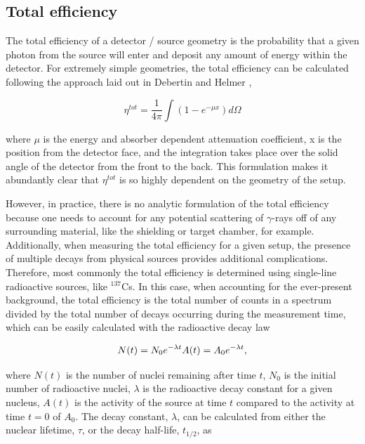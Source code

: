 \subsection{Total efficiency}

The total efficiency of a detector / source geometry is the probability that a given photon from the source will enter and deposit any amount of energy within the detector. For extremely simple geometries, the total efficiency can be calculated following the approach laid out in Debertin and Helmer \cite{DebertinHelmerBook},

\begin{equation}
\eta^{tot} = \dfrac{1}{4\pi} \int \left(1 - e^{-\mu x} \right) d\Omega
\end{equation}

\noindent where $\mu$ is the energy and absorber dependent attenuation coefficient, x is the position from the detector face, and the integration takes place over the solid angle of the detector from the front to the back. This formulation makes it abundantly clear that $\eta^{tot}$ is so highly dependent on the geometry of the setup. 

However, in practice, there is no analytic formulation of the total efficiency because one needs to account for any potential scattering of $\gamma$-rays off of any surrounding material, like the shielding or target chamber, for example. Additionally, when measuring the total efficiency for a given setup, the presence of multiple decays from physical sources provides additional complications. Therefore, most commonly the total efficiency is determined using single-line radioactive sources, like $^{137}$Cs. In this case, when accounting for the ever-present background, the total efficiency is the total number of counts in a spectrum divided by the total number of decays occurring during the measurement time, which can be easily calculated with the radioactive decay law

\begin{equation}
N(t) = N_{0} e^{- \lambda t} \hfill A(t) = A_{0} e^{- \lambda t},
\end{equation}

\noindent where $N(t)$ is the number of nuclei remaining after time $t$, $N_{0}$ is the initial number of radioactive nuclei, $\lambda$ is the radioactive decay constant for a given nucleus, $A(t)$ is the activity of the source at time $t$ compared to the activity at time $t=0$ of $A_{0}$. The decay constant, $\lambda$, can be calculated from either the nuclear lifetime, $\tau$, or the decay half-life, $t_{1/2}$, as

